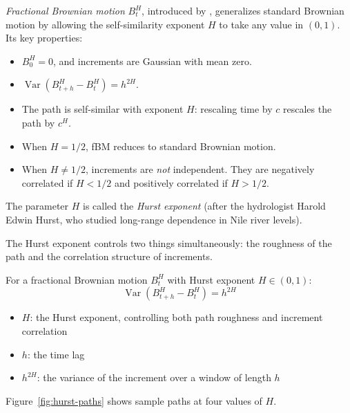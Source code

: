 \begin{prereq}
\emph{Fractional Brownian motion} $B^H_t$, introduced by \citet{MandelbrotVanNess1968}, generalizes standard Brownian motion by allowing the self-similarity exponent $H$ to take any value in $(0, 1)$.
Its key properties:
\begin{itemize}[nosep]
  \item $B^H_0 = 0$, and increments are Gaussian with mean zero.
  \item $\operatorname{Var}(B^H_{t+h} - B^H_t) = h^{2H}$.
  \item The path is self-similar with exponent $H$: rescaling time by $c$ rescales the path by $c^H$.
  \item When $H = 1/2$, fBM reduces to standard Brownian motion.
  \item When $H \neq 1/2$, increments are \emph{not} independent. They are negatively correlated if $H < 1/2$ and positively correlated if $H > 1/2$.
\end{itemize}
The parameter $H$ is called the \emph{Hurst exponent} (after the hydrologist Harold Edwin Hurst, who studied long-range dependence in Nile river levels).
\end{prereq}

The Hurst exponent controls two things simultaneously: the roughness of the path and the correlation structure of increments.

\begin{definition}
\label{def:hurst}
For a fractional Brownian motion $B^H_t$ with Hurst exponent $H \in (0,1)$:
\begin{equation}
  \operatorname{Var}(B^H_{t+h} - B^H_t) = h^{2H}
  \label{eq:fbm-variance}
\end{equation}
\begin{itemize}[nosep]
  \item $H$: the Hurst exponent, controlling both path roughness and increment correlation
  \item $h$: the time lag
  \item $h^{2H}$: the variance of the increment over a window of length $h$
\end{itemize}
\end{definition}

Figure~\ref{fig:hurst-paths} shows sample paths at four values of $H$.

